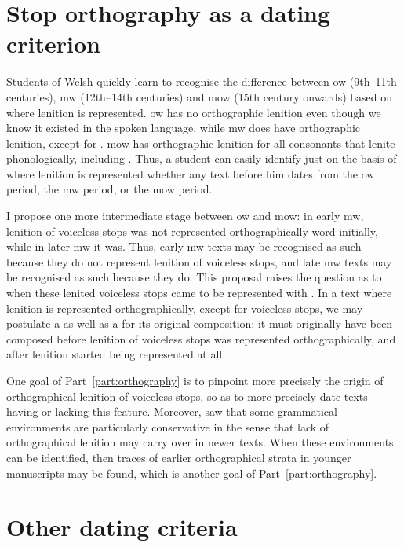 \section{Stop orthography as a dating criterion}
\label{sec:lenit-voic-stops-1}
Students of Welsh quickly learn to recognise the difference between \gls{ow} (9th--11th centuries), \gls{mw} (12th--14th centuries) and \gls{mow} (15th century onwards) based on where lenition is represented. \Gls{ow} has no orthographic lenition even though we know it existed in the spoken language, while \gls{mw} does have orthographic lenition, except for . \Gls{mow} has orthographic lenition for all consonants that lenite phonologically, including . Thus, a student can easily identify just on the basis of where lenition is represented whether any text before him dates from the \gls{ow} period, the \gls{mw} period, or the \gls{mow} period.

I propose one more intermediate stage between \gls{ow} and \gls{mow}: in early \gls{mw}, lenition of voiceless stops was not represented orthographically word-initially, while in later \gls{mw} it was. Thus, early \gls{mw} texts may be recognised as such because they do not represent lenition of voiceless stops, and late \gls{mw} texts may be recognised as such because they do. This proposal raises the question as to when these lenited voiceless stops came to be represented with . In a text where  lenition is represented orthographically, except for voiceless stops, we may postulate a  as well as a  for its original composition: it must originally have been composed before lenition of voiceless stops was represented orthographically, and after lenition started being represented at all.

One goal of Part~\ref{part:orthography} is to pinpoint more precisely  the origin of orthographical lenition of voiceless stops, so as to more precisely date texts having or lacking this feature. Moreover, \textcite{van_development14} saw that some grammatical environments are particularly conservative in the sense that lack of orthographical lenition may carry over in newer texts. When these environments can be identified, then traces of  earlier orthographical strata in younger manuscripts may be found, which is another goal of Part~\ref{part:orthography}.

\section{Other dating criteria}
\label{sec:other-dating-crit}

